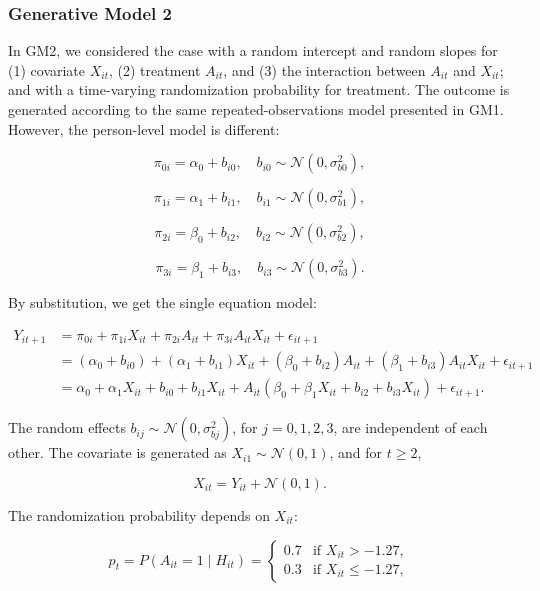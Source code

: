 \documentclass[
  12pt,
  a4paper,
]{article}
\begin{document}
\subsubsection{Generative Model 2}\label{generative-model-2}

In GM2, we considered the case with a random intercept and random slopes
for (1) covariate \(X_{it}\), (2) treatment \(A_{it}\), and (3) the
interaction between \(A_{it}\) and \(X_{it}\); and with a time-varying
randomization probability for treatment. The outcome is generated
according to the same repeated-observations model presented in GM1.
However, the person-level model is different:

\[
\pi_{0i} = \alpha_0 + b_{i0}, \quad b_{i0} \sim \mathcal{N}(0, \sigma_{b0}^2),
\]

\[
\pi_{1i} = \alpha_1 + b_{i1}, \quad b_{i1} \sim \mathcal{N}(0, \sigma_{b1}^2),
\]

\[
\pi_{2i} = \beta_0 + b_{i2}, \quad b_{i2} \sim \mathcal{N}(0, \sigma_{b2}^2),
\]

\[
\pi_{3i} = \beta_1 + b_{i3}, \quad b_{i3} \sim \mathcal{N}(0, \sigma_{b3}^2).
\]

By substitution, we get the single equation model:

\[
\begin{aligned}
Y_{it+1} &= \pi_{0i} + \pi_{1i} X_{it} + \pi_{2i} A_{it} + \pi_{3i} A_{it} X_{it} + \epsilon_{it+1} \\ 
&= (\alpha_0 + b_{i0}) + (\alpha_1 + b_{i1}) X_{it} + (\beta_0 + b_{i2}) A_{it} + (\beta_1 + b_{i3}) A_{it} X_{it} + \epsilon_{it+1} \\ 
&= \alpha_0 + \alpha_1 X_{it} + b_{i0} + b_{i1} X_{it} + A_{it} \left( \beta_0 + \beta_1 X_{it} + b_{i2} + b_{i3} X_{it} \right) + \epsilon_{it+1}.
\end{aligned}
\]

The random effects \(b_{ij} \sim \mathcal{N}(0, \sigma_{bj}^2)\), for
\(j = 0, 1, 2, 3\), are independent of each other. The covariate is
generated as \(X_{i1} \sim \mathcal{N}(0, 1)\), and for \(t \geq 2\),

\[
X_{it} = Y_{it} + \mathcal{N}(0, 1).
\]

The randomization probability depends on \(X_{it}\):

\[
p_t = P(A_{it} = 1 \mid H_{it}) = 
\begin{cases} 
0.7 & \text{if } X_{it} > -1.27, \\
0.3 & \text{if } X_{it} \leq -1.27,
\end{cases}
\]
\end{document}
